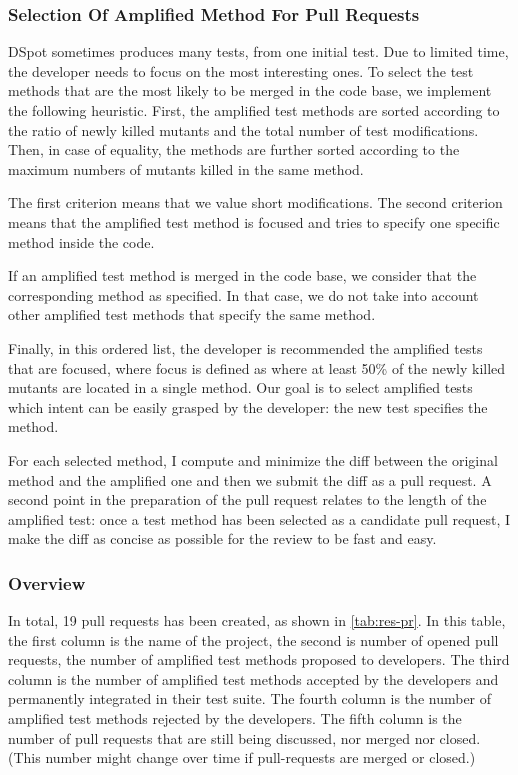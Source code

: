 \subsubsection{Selection Of Amplified Method For Pull Requests}
\label{subsubsec:test-improvement:experiment-results:rq1:selection}

DSpot sometimes produces many tests, from one initial test.
Due to limited time, the developer needs to focus on the most interesting ones.
To select the test methods that are the most likely to be merged in the code base, we implement the following  heuristic.
First, the amplified test methods are sorted according to the ratio of newly killed mutants and the total number of test modifications.
Then, in case of equality, the methods are further sorted according to the maximum numbers of mutants killed in the same method.

The first criterion means that we value short modifications.
The second criterion means that the amplified test method is focused and tries to specify one specific method inside the code.

If an amplified test method is merged in the code base, we consider that the corresponding method as specified. In that case, we do not take into account other amplified test methods that specify the same method.

Finally, in this ordered list, the developer is recommended the amplified tests that are focused, where focus is defined as where at least 50\% of the newly killed mutants are located in a single method. Our goal is to select amplified tests which intent can be easily grasped by the developer: the new test specifies the method.

For each selected  method, I compute and minimize the diff between the original method and the amplified one and then we submit the diff as a pull request.
A second point in the preparation of the pull request relates to the length of the amplified test: once a test method has been selected as a candidate pull request, I make the diff as concise as possible for the review to be fast and easy.

\subsubsection{Overview}

In total, 19 pull requests has been created, as shown in \autoref{tab:res-pr}. 
In this table, the first column is the name of the project, the second is number of opened pull requests, \ie the number of amplified test methods proposed to developers. 
The third column is the number of amplified test methods accepted by the developers and permanently integrated in their test suite. 
The fourth column is the number of amplified test methods rejected by the developers. 
The fifth column is the number of pull requests that are still being discussed, \ie nor merged nor closed. (This number might change over time if pull-requests are merged or closed.)

